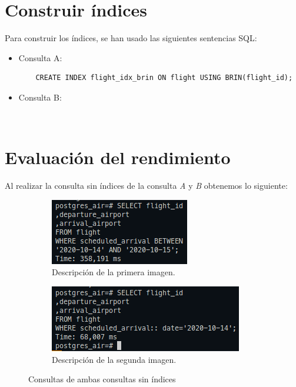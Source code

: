 \documentclass[11pt]{report}
\begin{document}
\section{Construir índices}
Para construir los índices, se han usado las siguientes sentencias SQL:
\begin{itemize}
  \item Consulta A:
  \begin{verbatim}
    CREATE INDEX flight_idx_brin ON flight USING BRIN(flight_id);
  \end{verbatim}

  \item Consulta B:
  \begin{verbatim}
    
  \end{verbatim}
\end{itemize}





\section{Evaluación del rendimiento}
Al realizar la consulta sin índices de la consulta \emph{A} y \emph{B} obtenemos lo siguiente:
\begin{figure}[H]
  \begin{subfigure}{0.5\textwidth}
    \centering
    \includegraphics[scale=0.7]{img/consulta_A_sin_indice.png}
    \caption{Descripción de la primera imagen.}
  \end{subfigure}%
  \begin{subfigure}{0.5\textwidth}
    \centering
    \includegraphics[scale=0.7]{img/consulta_b_sin_indice.png}
    \caption{Descripción de la segunda imagen.}
  \end{subfigure}
  \caption{Consultas de ambas consultas sin índices}
\end{figure}
\end{document}
